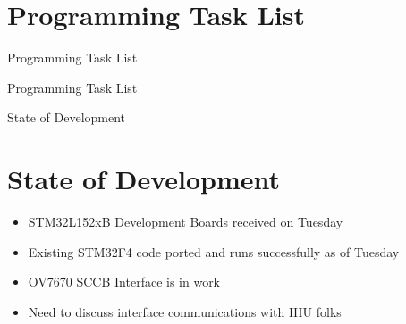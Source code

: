 \documentclass{beamer}
\begin{document}
\section{Programming Task List}
\begin{frame}{Programming Task List}
	\begin{center}
		\large{Programming Task List}
	\end{center}
\end{frame}


\begin{frame}{State of Development}
\section{State of Development}
		\begin{itemize}
			\item STM32L152xB Development Boards received on Tuesday
			\item Existing STM32F4 code ported and runs successfully as of Tuesday
			\item OV7670 SCCB Interface is in work
			\item Need to discuss interface communications with IHU folks
		\end{itemize}
\end{frame}
\end{document}
